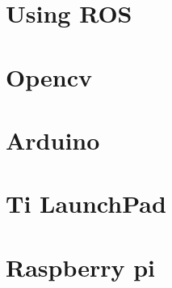 \section{Using ROS}

%
\section{Opencv}
%
\section{Arduino}

%
\section{Ti LaunchPad}

%
\section{Raspberry pi}

%

%


